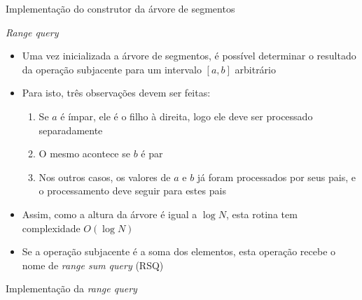 

\begin{frame}[fragile]{Implementação do construtor da árvore de segmentos}
\end{frame}

\begin{frame}[fragile]{\it Range query}

    \begin{itemize}
        \item Uma vez inicializada a árvore de segmentos, é possível determinar o resultado
            da operação subjacente para um intervalo $[a, b]$ arbitrário

        \item Para isto, três observações devem ser feitas:
            \begin{enumerate}
                \item Se $a$ é ímpar, ele é o filho à direita, logo ele deve ser processado
                    separadamente

                \item O mesmo acontece se $b$ é par

                \item Nos outros casos, os valores de $a$ e $b$ já foram processados por seus
                    pais, e o processamento deve seguir para estes pais
            \end{enumerate}

        \item Assim, como a altura da árvore é igual a $\log N$, esta rotina tem complexidade
            $O(\log N)$

        \item Se a operação subjacente é a soma dos elementos, esta operação recebe o nome de
            \textit{range sum query} (RSQ)
    \end{itemize}

\end{frame}



\begin{frame}[fragile]{Implementação da {\it range query}}
\end{frame}
